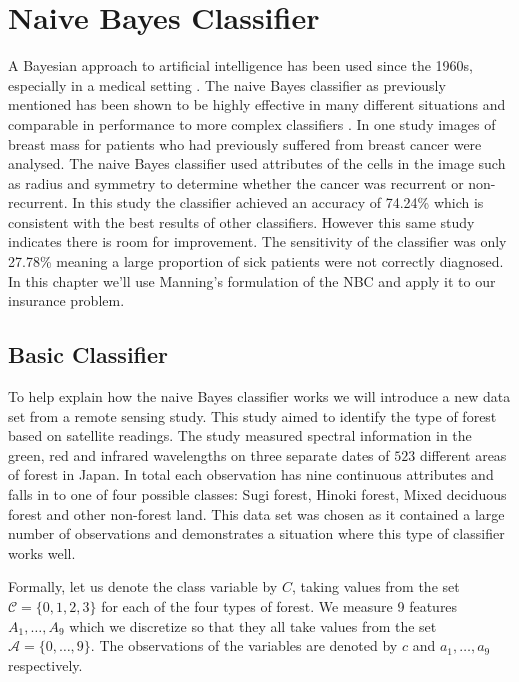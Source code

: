 \chapter{Naive Bayes Classifier}

A Bayesian approach to artificial intelligence has been used since the 1960s, especially in a medical setting \cite{Russell03}.
The naive Bayes classifier as previously mentioned has been shown to be highly effective in many different situations and comparable in performance to more complex classifiers \cite{Ashari13}.
In one study \cite{Dumitru09} images of breast mass for patients who had previously suffered from breast cancer were analysed.
The naive Bayes classifier used attributes of the cells in the image such as radius and symmetry to determine whether the cancer was recurrent or non-recurrent.
In this study the classifier achieved an accuracy of 74.24\% which is consistent with the best results of other classifiers.
However this same study indicates there is room for improvement.
The sensitivity of the classifier was only 27.78\% meaning a large proportion of sick patients were not correctly diagnosed.
In this chapter we'll use Manning's \cite{Manning08} formulation of the NBC and apply it to our insurance problem.


\section{Basic Classifier}

To help explain how the naive Bayes classifier works we will introduce a new data set from a remote sensing study.
This study aimed to identify the type of forest based on satellite readings.
The study measured spectral information in the green, red and infrared wavelengths on three separate dates of $523$ different areas of forest in Japan.
In total each observation has nine continuous attributes and falls in to one of four possible classes: Sugi forest, Hinoki forest, Mixed deciduous forest and other non-forest land.
This data set was chosen as it contained a large number of observations and demonstrates a situation where this type of classifier works well.

Formally, let us denote the class variable by $C$, taking values from the set $\mathcal{C} = \{0,1,2,3\}$ for each of the four types of forest.
We measure 9 features $A_1,\dots,A_9$ which we discretize so that they all take values from the set $\mathcal{A} = \{0,\dots,9\}$.
The observations of the variables are denoted by $c$ and $a_1,\dots,a_9$ respectively.

